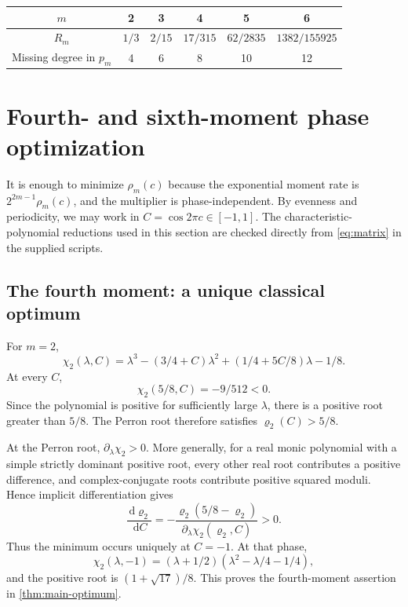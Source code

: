 \documentclass[11pt,a4paper]{article}
\numberwithin{equation}{section}
\theoremstyle{definition}
\theoremstyle{remark}
\newcommand{\dd}{\,\mathrm d}
\begin{document}
\begin{center}
\begin{tabular}{@{}cccccc@{}}
\toprule
$m$&2&3&4&5&6\\
\midrule
$R_m$&$1/3$&$2/15$&$17/315$&$62/2835$&$1382/155925$\\
Missing degree in $p_m$&4&6&8&10&12\\
\bottomrule
\end{tabular}
\end{center}

\section{Fourth- and sixth-moment phase optimization}
\label{sec:optimum}
It is enough to minimize $\rho_m(c)$ because the exponential moment
rate is $2^{2m-1}\rho_m(c)$, and the multiplier is phase-independent.
By evenness and periodicity, we may work in $C=\cos2\pi c\in[-1,1]$.
The characteristic-polynomial reductions used in this section are
checked directly from \cref{eq:matrix} in the supplied scripts.

\subsection{The fourth moment: a unique classical optimum}
For $m=2$,
\begin{equation}
 \chi_2(\lambda,C)=\lambda^3-(3/4+C)\lambda^2
 +(1/4+5C/8)\lambda-1/8.
 \label{eq:chi2}
\end{equation}
At every $C$,
\[
 \chi_2(5/8,C)=-9/512<0.
\]
Since the polynomial is positive for sufficiently large $\lambda$,
there is a positive root greater than $5/8$. The Perron root therefore
satisfies $\varrho_2(C)>5/8$.

At the Perron root, $\partial_\lambda\chi_2>0$. More generally,
for a real monic polynomial with a simple strictly dominant positive
root, every other real root contributes a positive difference, and
complex-conjugate roots contribute positive squared moduli. Hence
implicit differentiation gives
\[
 \frac{\dd\varrho_2}{\dd C}
 =-\frac{\varrho_2(5/8-\varrho_2)}{\partial_\lambda\chi_2(\varrho_2,C)}>0.
\]
Thus the minimum occurs uniquely at $C=-1$. At that phase,
\[
 \chi_2(\lambda,-1)
 =(\lambda+1/2)(\lambda^2-\lambda/4-1/4),
\]
and the positive root is $(1+\sqrt{17})/8$. This proves the
fourth-moment assertion in \cref{thm:main-optimum}.
\end{document}
